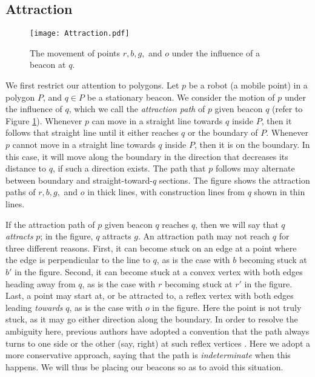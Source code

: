 \documentclass{article}
\begin{document}
	\subsection{Attraction}
		\begin{figure}[htbp] 
			\begin{center}
			    \texttt{[image: Attraction.pdf]} 
			\end{center}
			\caption{
				The movement of points $r, b, g,$ and $o$ under the influence of a beacon at
				$q$. }
			\label{fig:attraction}
		\end{figure}
		We first restrict our attention to polygons.
		Let $p$ be a robot (a mobile point) in a polygon $P$, and $q \in P$ be a
		stationary beacon. We consider the motion of $p$ under the influence of $q$,
		which we call the \emph{attraction path} of $p$ given beacon $q$
		(refer to Figure \ref{fig:attraction}).
		Whenever $p$ can move in a straight
		line towards $q$ inside $P$, then it follows that straight line until it either reaches $q$ or the
		boundary of $P$.
		Whenever $p$ cannot move in a straight line towards $q$ inside $P$, then
		it is on the boundary.
		In this case, it will move along the boundary in the direction that
		decreases its distance to $q$, if such a direction exists.
		The path that $p$ follows may alternate between boundary and
		straight-toward-$q$ sections.
		The figure shows the attraction paths of $r, b, g,$ and $o$ in thick lines,
		with construction lines from $q$ shown in thin lines.
		
		If the attraction path of $p$ given beacon $q$ reaches $q$, then we will
		say that $q$ \emph{attracts} $p$; in the figure, $q$ attracts $g$.
		An attraction path may not reach $q$ for three different reasons.  First,  it
		can become stuck on an edge at a point where the edge is perpendicular to the
		line to $q$, as is the case with $b$ becoming stuck at $b'$ in the figure.
		Second, it can become stuck at a convex vertex with both edges heading away
		from $q$, as is the case with $r$ becoming stuck at $r'$ in the figure.
		Last, a point may start at, or be attracted to, a reflex vertex with both
		edges leading \emph{towards} $q$, as is the case with $o$ in the figure.
		Here the point is not truly stuck, as it may go either direction along the
		boundary.
		In order to resolve the ambiguity here, previous authors have
		adopted a convention that the path always turns to one side or the other
		(say, right) at such reflex vertices \cite{biro2013beacon}.  Here we adopt a
		more conservative approach, saying that the path is \emph{indeterminate} when this happens.
		We will thus be placing our beacons so as to avoid this situation.
\end{document}
